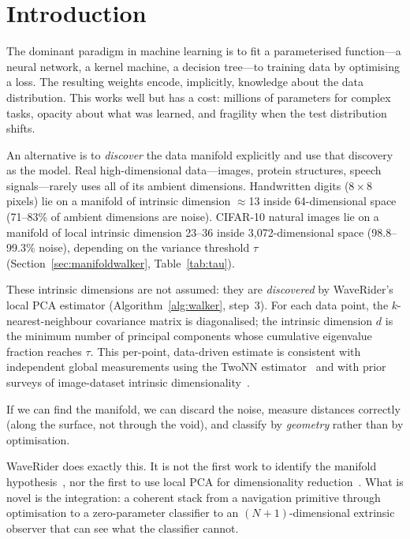 \documentclass[12pt,letterpaper]{article}
\begin{document}
\section{Introduction}

The dominant paradigm in machine learning is to fit a parameterised function---a
neural network, a kernel machine, a decision tree---to training data by
optimising a loss. The resulting weights encode, implicitly, knowledge about the
data distribution. This works well but has a cost: millions of parameters for
complex tasks, opacity about what was learned, and fragility when the test
distribution shifts.

An alternative is to \emph{discover} the data manifold explicitly and use that
discovery as the model. Real high-dimensional data---images, protein structures,
speech signals---rarely uses all of its ambient dimensions.
Handwritten digits ($8{\times}8$ pixels) lie on a manifold of intrinsic
dimension $\approx$13 inside 64-dimensional space (71--83\% of ambient
dimensions are noise).
CIFAR-10 natural images lie on a manifold of local intrinsic dimension 23--36
inside 3{,}072-dimensional space (98.8--99.3\% noise), depending on the
variance threshold $\tau$ (Section~\ref{sec:manifoldwalker},
Table~\ref{tab:tau}).

These intrinsic dimensions are not assumed: they are \emph{discovered} by
WaveRider's local PCA estimator (Algorithm~\ref{alg:walker}, step~3).
For each data point, the $k$-nearest-neighbour covariance matrix is
diagonalised; the intrinsic dimension $d$ is the minimum number of principal
components whose cumulative eigenvalue fraction reaches $\tau$.
This per-point, data-driven estimate is consistent with independent global
measurements using the TwoNN estimator~\cite{facco17} and with prior surveys
of image-dataset intrinsic dimensionality~\cite{pope21}.

If we can find the manifold, we can discard the noise, measure distances
correctly (along the surface, not through the void), and classify by
\emph{geometry} rather than by optimisation.

WaveRider does exactly this. It is not the first work to identify the manifold
hypothesis~\cite{isomap,lle}, nor the first to use local PCA for dimensionality
reduction~\cite{kambhatla97,hinton06}. What is novel is the integration: a
coherent stack from a navigation primitive through optimisation to a
zero-parameter classifier to an $(N+1)$-dimensional extrinsic observer that can
see what the classifier cannot.
\end{document}
